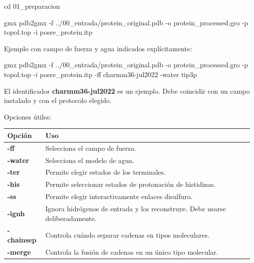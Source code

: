 \documentclass[
  spanish,
  11pt,
  a4paper]{article}
\newenvironment{Shaded}{\begin{snugshade}}{\end{snugshade}}
\newcommand{\AttributeTok}[1]{\textcolor[rgb]{0.13,0.29,0.53}{#1}}
\newcommand{\BuiltInTok}[1]{#1}
\newcommand{\ExtensionTok}[1]{#1}
\newcommand{\NormalTok}[1]{#1}
\newcounter{none} %
\begin{document}
\begin{Shaded}
\begin{Highlighting}[]
\BuiltInTok{cd}\NormalTok{ 01\_preparacion}

\ExtensionTok{gmx}\NormalTok{ pdb2gmx     }\AttributeTok{{-}f}\NormalTok{ ../00\_entrada/protein\_original.pdb     }\AttributeTok{{-}o}\NormalTok{ protein\_processed.gro     }\AttributeTok{{-}p}\NormalTok{ topol.top     }\AttributeTok{{-}i}\NormalTok{ posre\_protein.itp}
\end{Highlighting}
\end{Shaded}

Ejemplo con campo de fuerza y agua indicados explícitamente:

\begin{Shaded}
\begin{Highlighting}[]
\ExtensionTok{gmx}\NormalTok{ pdb2gmx     }\AttributeTok{{-}f}\NormalTok{ ../00\_entrada/protein\_original.pdb     }\AttributeTok{{-}o}\NormalTok{ protein\_processed.gro     }\AttributeTok{{-}p}\NormalTok{ topol.top     }\AttributeTok{{-}i}\NormalTok{ posre\_protein.itp     }\AttributeTok{{-}ff}\NormalTok{ charmm36{-}jul2022     }\AttributeTok{{-}water}\NormalTok{ tip3p}
\end{Highlighting}
\end{Shaded}

El identificador \textbf{charmm36-jul2022} es un ejemplo. Debe coincidir
con un campo instalado y con el protocolo elegido.

Opciones útiles:

{\def\LTcaptype{none} %
\begin{longtable}[]{@{}
  >{\raggedright\arraybackslash}p{}
  >{\raggedright\arraybackslash}p{}@{}}
\toprule\noalign{}
\begin{minipage}[b]{\linewidth}\raggedright
Opción
\end{minipage} & \begin{minipage}[b]{\linewidth}\raggedright
Uso
\end{minipage} \\
\midrule\noalign{}
\endhead
\bottomrule\noalign{}
\endlastfoot
\textbf{-ff} & Selecciona el campo de fuerza. \\
\textbf{-water} & Selecciona el modelo de agua. \\
\textbf{-ter} & Permite elegir estados de los terminales. \\
\textbf{-his} & Permite seleccionar estados de protonación de
histidinas. \\
\textbf{-ss} & Permite elegir interactivamente enlaces disulfuro. \\
\textbf{-ignh} & Ignora hidrógenos de entrada y los reconstruye. Debe
usarse deliberadamente. \\
\textbf{-chainsep} & Controla cuándo separar cadenas en tipos
moleculares. \\
\textbf{-merge} & Controla la fusión de cadenas en un único tipo
molecular. \\
\end{longtable}
}
\end{document}
